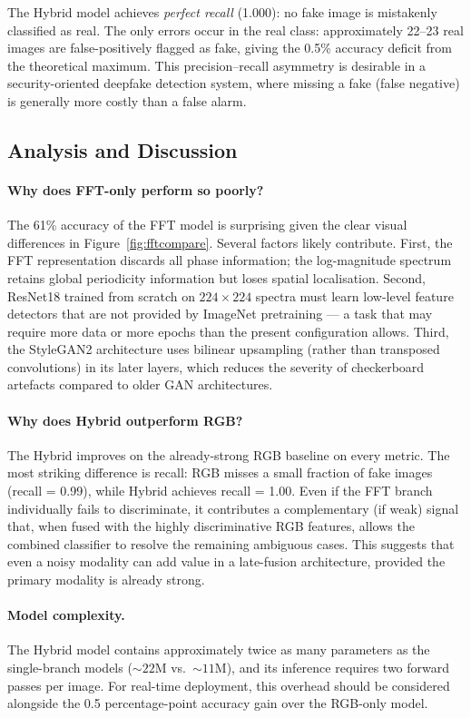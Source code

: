 \documentclass[12pt, a4paper]{article}
\begin{document}
The Hybrid model achieves \emph{perfect recall} (1.000): no fake image is
mistakenly classified as real.  The only errors occur in the real class:
approximately 22--23 real images are false-positively flagged as fake, giving
the 0.5\% accuracy deficit from the theoretical maximum.  This precision–recall
asymmetry is desirable in a security-oriented deepfake detection system, where
missing a fake (false negative) is generally more costly than a false alarm.

\subsection{Analysis and Discussion}

\paragraph{Why does FFT-only perform so poorly?}
The 61\% accuracy of the FFT model is surprising given the clear visual
differences in Figure~\ref{fig:fftcompare}.  Several factors likely contribute.
First, the FFT representation discards all phase information; the log-magnitude
spectrum retains global periodicity information but loses spatial localisation.
Second, ResNet18 trained from scratch on $224 \times 224$ spectra must learn
low-level feature detectors that are not provided by ImageNet pretraining — a
task that may require more data or more epochs than the present configuration
allows.  Third, the StyleGAN2 architecture uses bilinear upsampling (rather
than transposed convolutions) in its later layers, which reduces the severity
of checkerboard artefacts compared to older GAN architectures.

\paragraph{Why does Hybrid outperform RGB?}
The Hybrid improves on the already-strong RGB baseline on every metric.  The
most striking difference is recall: RGB misses a small fraction of fake images
(recall = 0.99), while Hybrid achieves recall = 1.00.  Even if the FFT branch
individually fails to discriminate, it contributes a complementary (if weak)
signal that, when fused with the highly discriminative RGB features, allows the
combined classifier to resolve the remaining ambiguous cases.  This suggests
that even a noisy modality can add value in a late-fusion architecture,
provided the primary modality is already strong.

\paragraph{Model complexity.}
The Hybrid model contains approximately twice as many parameters as the
single-branch models (${\sim}22\text{M}$ vs.\ ${\sim}11\text{M}$), and its
inference requires two forward passes per image.  For real-time deployment,
this overhead should be considered alongside the 0.5 percentage-point accuracy
gain over the RGB-only model.
\end{document}
